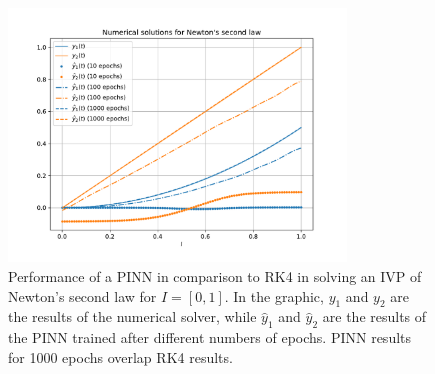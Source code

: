 \begin{figure}[h]
    \centering
    \includegraphics[width=0.8\textwidth]{images/pinn_newton.pdf}
    \caption{Performance of a \gls{PINN} in comparison to \gls{RK4} in solving an \gls{IVP} of Newton's second law for $I=\left[ 0,1 \right] $. In the graphic, $y_1$ and $y_2$ are the results of the numerical solver, while $\hat{y}_1$ and $\hat{y}_2$ are the results of the \gls{PINN} trained after different numbers of epochs. \gls{PINN} results for 1000 epochs overlap \gls{RK4} results.}
    \label{fig:images-pinn_newton-pdf}
\end{figure}

